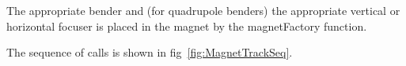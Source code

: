 \documentclass[a4paper,12pt]{article}
\begin{document}
The appropriate bender and (for quadrupole benders) the appropriate vertical or horizontal focuser is placed in the
magnet by the magnetFactory function.

The sequence of calls is shown in fig~\ref{fig:MagnetTrackSeq}.

\begin{figure}
  \begin{center}
  \end{center} 
\end{figure}
\end{document}
